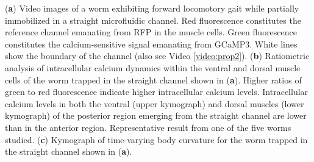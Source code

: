 \begin{FPfigure}
{(\textbf{a}) Video images of a worm exhibiting forward locomotory gait while partially immobilized in a straight 
microfluidic channel. Red fluorescence constitutes the reference channel emanating from RFP in the 
muscle cells. Green fluorescence constitutes the calcium-sensitive signal emanating from GCaMP3. 
White lines show the boundary of the channel (also see Video  \ref{video:prop2}). 
(\textbf{b}) Ratiometric analysis of intracellular calcium dynamics within the ventral and dorsal muscle cells 
of the worm trapped in the straight channel shown in (\textbf{a}). Higher ratios of green to red fluorescence 
indicate higher intracellular calcium levels. Intracellular calcium levels in both the ventral (upper 
kymograph) and dorsal muscles (lower kymograph) of the posterior region emerging from the straight 
channel are lower than in the anterior region. Representative result from one of the five worms studied. 
(\textbf{c}) Kymograph of time-varying body curvature for the worm trapped in the straight channel shown in (\textbf{a}). 
\label{fig:prop_sup2}}
\end{FPfigure}

